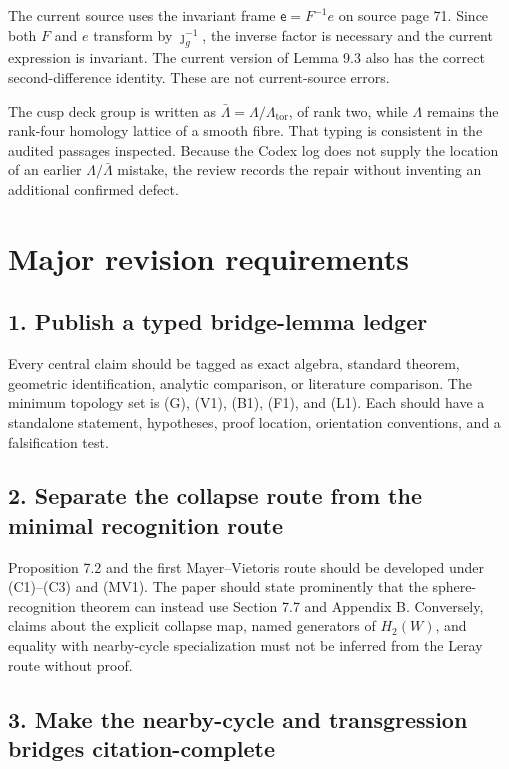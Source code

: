 \documentclass[
  10pt,
  letterpaper,
]{article}
\begin{document}
The current source uses the invariant frame \(\mathsf e=F^{-1}e\) on
source page 71. Since both \(F\) and \(e\) transform by
\(\jmath_g^{-1}\), the inverse factor is necessary and the current
expression is invariant. The current version of Lemma 9.3 also has the
correct second-difference identity. These are not current-source errors.

The cusp deck group is written as
\(\bar\Lambda=\Lambda/\Lambda_{\mathrm{tor}}\), of rank two, while
\(\Lambda\) remains the rank-four homology lattice of a smooth fibre.
That typing is consistent in the audited passages inspected. Because the
Codex log does not supply the location of an earlier
\(\Lambda/\bar\Lambda\) mistake, the review records the repair without
inventing an additional confirmed defect.

\section{Major revision requirements}\label{major-revision-requirements}

\subsection{1. Publish a typed bridge-lemma
ledger}\label{publish-a-typed-bridge-lemma-ledger}

Every central claim should be tagged as exact algebra, standard theorem,
geometric identification, analytic comparison, or literature comparison.
The minimum topology set is (G), (V1), (B1), (F1), and (L1). Each should
have a standalone statement, hypotheses, proof location, orientation
conventions, and a falsification test.

\subsection{2. Separate the collapse route from the minimal recognition
route}\label{separate-the-collapse-route-from-the-minimal-recognition-route}

Proposition 7.2 and the first Mayer--Vietoris route should be developed
under (C1)--(C3) and (MV1). The paper should state prominently that the
sphere-recognition theorem can instead use Section 7.7 and Appendix B.
Conversely, claims about the explicit collapse map, named generators of
\(H_2(W)\), and equality with nearby-cycle specialization must not be
inferred from the Leray route without proof.

\subsection{3. Make the nearby-cycle and transgression bridges
citation-complete}\label{make-the-nearby-cycle-and-transgression-bridges-citation-complete}
\end{document}
